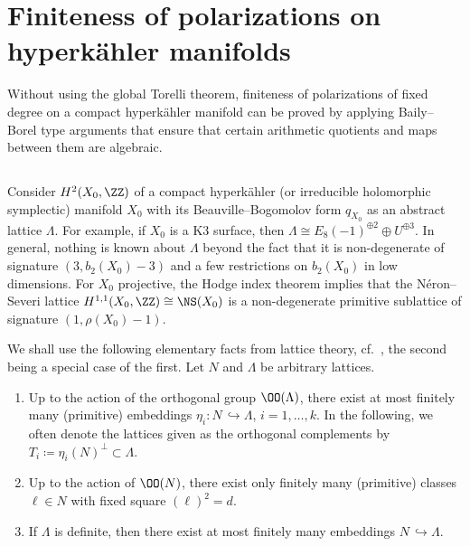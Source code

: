 \section{Finiteness of polarizations on hyperk\"ahler manifolds}\label{sec:FinHK}

Without using the global Torelli theorem, finiteness of polarizations of fixed degree on a compact hyperk\"ahler manifold can be proved by applying Baily--Borel type arguments that ensure that certain arithmetic quotients and maps between them are algebraic.

\subsection{}
Consider $H^2(X_0,\ZZ)$ of a compact hyperk\"ahler (or irreducible holomorphic symplectic) mani\-fold $X_0$ with its Beauville--Bogomolov form $q_{X_0}$ as an abstract lattice $\Lambda$. For example, if $X_0$ is a K3 surface, then $\Lambda\cong E_8(-1)^{\oplus 2}\oplus U^{\oplus 3}$. In general, nothing is known about $\Lambda$ beyond the fact that it is non-degenerate of signature $(3,b_2(X_0)-3)$ and a few restrictions on $b_2(X_0)$ in low dimensions. For $X_0$ projective, the Hodge index theorem implies that the N\'eron--Severi lattice $H^{1,1}(X_0,\ZZ)\cong\NS(X_0)$ is a non-degenerate primitive sublattice of signature $(1,\rho(X_0)-1)$.

\begin{rema}\label{rem:Kneser}
We shall use the following elementary facts from lattice theory, cf.~\cite[Satz~30.2]{Kneser}, the second being a special case of the first. Let $N$ and $\Lambda$ be arbitrary lattices.
\begin{enumerate}
\item \label{1.1.1} Up to the action of the orthogonal group $\OO(\Lambda)$, there exist at most finitely many (primitive) embeddings $\eta_i\colon N\,\hookrightarrow \Lambda$, $i=1,\dots,k$. In the following, we often denote the lattices given as the orthogonal complements by $T_i\coloneqq \eta_i(N)^\perp\subset \Lambda$.
\item \label{1.1.2} Up to the action of $\OO(N)$, there exist only finitely many (primitive) classes $\ell\in N$ with fixed square $(\ell)^2=d$.
\item \label{1.1.3} If $\Lambda$ is definite, then there exist at most finitely many embeddings $N\,\hookrightarrow\Lambda$.
\end{enumerate}
\end{rema}

